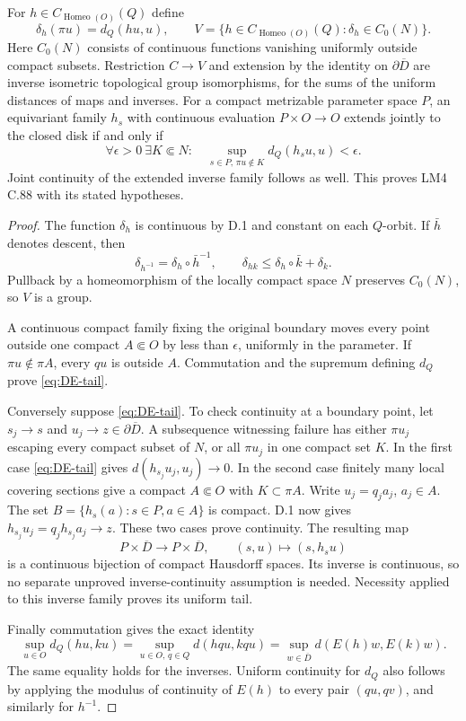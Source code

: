 For $h\in C_{\operatorname{Homeo}(O)}(Q)$ define
\[
 \delta_h(\pi u)=d_Q(hu,u),\qquad
 V=\{h\in C_{\operatorname{Homeo}(O)}(Q):\delta_h\in C_0(N)\}.
\]
Here $C_0(N)$ consists of continuous functions vanishing uniformly
outside compact subsets.  Restriction $C\to V$ and extension by the
identity on $\partial\overline D$ are inverse isometric topological
group isomorphisms, for the sums of the uniform distances of maps and
inverses.  For a compact metrizable parameter space $P$, an equivariant
family $h_s$ with continuous evaluation $P\times O\to O$ extends
jointly to the closed disk if and only if
\begin{equation}\label{eq:DE-tail}
 \forall\epsilon>0\ \exists K\Subset N:\quad
 \sup_{s\in P,\,\pi u\notin K}d_Q(h_su,u)<\epsilon.
\end{equation}
Joint continuity of the extended inverse family follows as well.
This proves LM4 C.88 with its stated hypotheses.
\begin{proof}
The function $\delta_h$ is continuous by D.1 and constant on each
$Q$-orbit.  If $\bar h$ denotes descent, then
\[
 \delta_{h^{-1}}=\delta_h\circ\bar h^{-1},\qquad
 \delta_{hk}\leq\delta_h\circ\bar k+\delta_k.
\]
Pullback by a homeomorphism of the locally compact space $N$ preserves
$C_0(N)$, so $V$ is a group.

A continuous compact family fixing the original boundary moves every
point outside one compact $A\Subset O$ by less than $\epsilon$,
uniformly in the parameter.  If $\pi u\notin\pi A$, every $qu$ is
outside $A$.  Commutation and the supremum defining $d_Q$ prove
\eqref{eq:DE-tail}.

Conversely suppose \eqref{eq:DE-tail}.  To check continuity at a
boundary point, let $s_j\to s$ and $u_j\to z\in\partial\overline D$.
A subsequence witnessing failure has either $\pi u_j$ escaping every
compact subset of $N$, or all $\pi u_j$ in one compact set $K$.
In the first case \eqref{eq:DE-tail} gives
$d(h_{s_j}u_j,u_j)\to0$.  In the second case finitely many local
covering sections give a compact $A\Subset O$ with $K\subset\pi A$.
Write $u_j=q_ja_j$, $a_j\in A$.  The set
$B=\{h_s(a):s\in P,a\in A\}$ is compact.  D.1 now gives
$h_{s_j}u_j=q_jh_{s_j}a_j\to z$.  These two cases prove continuity.
The resulting map
\[
 P\times\overline D\longrightarrow P\times\overline D,
 \qquad(s,u)\longmapsto(s,h_su)
\]
is a continuous bijection of compact Hausdorff spaces.  Its inverse
is continuous, so no separate unproved inverse-continuity assumption
is needed.  Necessity applied to this inverse family proves its
uniform tail.

Finally commutation gives the exact identity
\[
 \sup_{u\in O}d_Q(hu,ku)
 =\sup_{u\in O,\,q\in Q}d(hqu,kqu)
 =\sup_{w\in\overline D}d(E(h)w,E(k)w).
\]
The same equality holds for the inverses.  Uniform continuity for
$d_Q$ also follows by applying the modulus of continuity of $E(h)$
to every pair $(qu,qv)$, and similarly for $h^{-1}$.
\end{proof}

